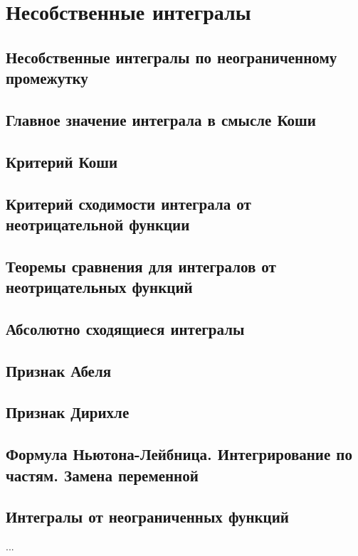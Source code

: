 \section{Несобственные интегралы}
\subsection{Несобственные интегралы по неограниченному промежутку}

\subsection{Главное значение интеграла в смысле Коши}

\subsection{Критерий Коши}

\subsection{Критерий сходимости интеграла от неотрицательной функции}

\subsection{Теоремы сравнения для интегралов от неотрицательных функций}
\subsection{Абсолютно сходящиеся интегралы}
\subsection{Признак Абеля}
\subsection{Признак Дирихле}
\subsection{Формула Ньютона-Лейбница. Интегрирование по частям. Замена переменной}
\subsection{Интегралы от неограниченных функций}
...

